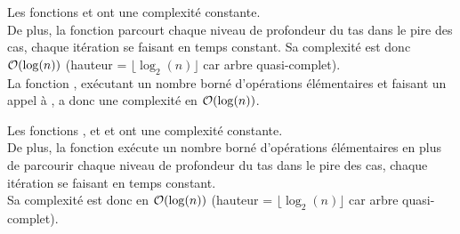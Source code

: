 \begin{demonstration}
    Les fonctions  et  ont une complexité constante.\\
    De plus, la fonction  parcourt chaque niveau de profondeur du tas dans le pire des cas, chaque itération se faisant en temps constant. Sa complexité est donc $\mathcal{O}(\log(n))$ (hauteur = $\lfloor \log_2(n) \rfloor$ car arbre quasi-complet).\\
    La fonction , exécutant un nombre borné d'opérations élémentaires et faisant un appel à , a donc une complexité en $\mathcal{O}(\log(n))$.
\end{demonstration}

\begin{demonstration}
    Les fonctions , et  et  ont une complexité constante.\\
    De plus, la fonction  exécute un nombre borné d'opérations élémentaires en plus de parcourir chaque niveau de profondeur du tas dans le pire des cas, chaque itération se faisant en temps constant.\\
    Sa complexité est donc en $\mathcal{O}(\log(n))$ (hauteur = $\lfloor \log_2(n) \rfloor$ car arbre quasi-complet).
\end{demonstration}
